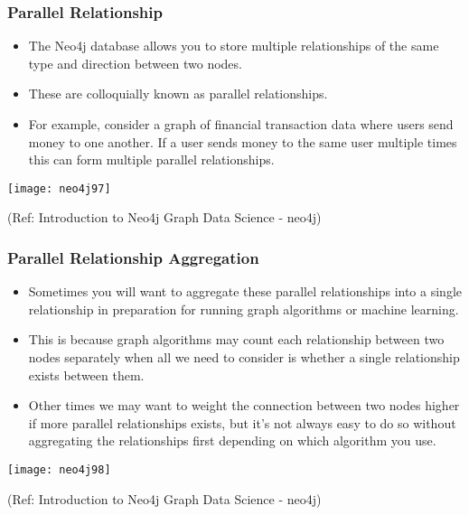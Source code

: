 \begin{frame}[fragile]\frametitle{Parallel Relationship}

\begin{itemize}
\item The Neo4j database allows you to store multiple relationships of the same type and direction between two nodes.
\item These are colloquially known as parallel relationships. 
\item For example, consider a graph of financial transaction data where users send money to one another. If a user sends money to the same user multiple times this can form multiple parallel relationships.
\end{itemize}

\begin{center}
\texttt{[image: neo4j97]}
\end{center}	

{\tiny (Ref: Introduction to Neo4j Graph Data Science - neo4j)}
\end{frame}

\begin{frame}[fragile]\frametitle{Parallel Relationship Aggregation}

\begin{itemize}
\item Sometimes you will want to aggregate these parallel relationships into a single relationship in preparation for running graph algorithms or machine learning. 
\item This is because graph algorithms may count each relationship between two nodes separately when all we need to consider is whether a single relationship exists between them. 
\item Other times we may want to weight the connection between two nodes higher if more parallel relationships exists, but it’s not always easy to do so without aggregating the relationships first depending on which algorithm you use.
\end{itemize}

\begin{center}
\texttt{[image: neo4j98]}
\end{center}	

{\tiny (Ref: Introduction to Neo4j Graph Data Science - neo4j)}

\end{frame}

